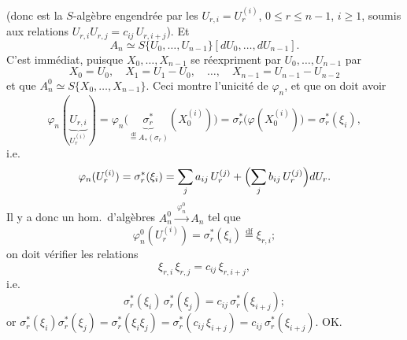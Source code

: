 \documentclass[11pt,a4paper]{article}
\begin{document}
\struck{\ill{}} (donc est la $S$-algèbre engendrée par les
$U_{r,i} = U_r^{(i)}$, $0 \leqslant r \leqslant n-1$, $i \geqslant 1$, soumis aux
relations $U_{r,i}U_{r,j} = c_{ij}\,U_{r,i+j}$). Et
\[
  A_n \simeq S\{U_0, \ldots, U_{n-1}\}[dU_0, \ldots, dU_{n-1}] .
\]
C'est immédiat, puisque $X_0, \ldots, X_{n-1}$ se
réexpriment par $U_0, \ldots, U_{n-1}$ par
\[
  X_0 = U_0, \quad X_1 = U_1 - U_0, \quad \ldots, \quad X_{n-1} = U_{n-1} - U_{n-2}
\]
et que $A_n^0 \simeq S\{X_0, \ldots, X_{n-1}\}$. Ceci montre l'unicité de
$\varphi_n$, et que on doit avoir
\[
  \varphi_n(\underbrace{U_{r,i}}_{U_r^{(i)}})
  = \varphi_n\bigl(\underbrace{\sigma_r^{*}}_{\overset{\mathrm{df}}{=} A_*(\sigma_r)}(X_0^{(i)})\bigr)
  = \sigma_r^{*}\bigl(\varphi(X_0^{(i)})\bigr)
  = \sigma_r^{*}(\xi_i) ,
\]
i.e.
\[
  \varphi_n(U_r^{(i)}) = \sigma_r^{*}(\xi_i)
  = \sum_j a_{ij}\,U_r^{(j)} + \Bigl(\sum_j b_{ij}\,U_r^{(j)}\Bigr) dU_r .
\]
Il y a donc un hom.\ d'algèbres 
$A_n^0 \xrightarrow{\ \varphi_n^0\ } A_n$ tel que
\[
  \varphi_n^0(U_r^{(i)}) = \sigma_r^{*}(\xi_i) \overset{\mathrm{df}}{=} \xi_{r,i} ;
\]
on doit vérifier les relations
\[
  \xi_{r,i}\,\xi_{r,j} = c_{ij}\,\xi_{r,i+j} ,
\]
i.e.
\[
  \sigma_r^{*}(\xi_i)\,\sigma_r^{*}(\xi_j) = c_{ij}\,\sigma_r^{*}(\xi_{i+j}) ;
\]
or $\sigma_r^{*}(\xi_i)\sigma_r^{*}(\xi_j) = \sigma_r^{*}(\xi_i\xi_j)
= \sigma_r^{*}(c_{ij}\,\xi_{i+j}) = c_{ij}\,\sigma_r^{*}(\xi_{i+j})$. OK.
\end{document}
